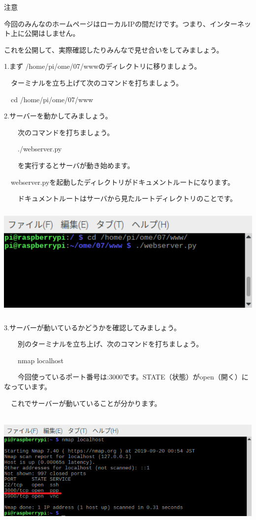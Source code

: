 \documentclass[a4paper,12pt,dvipdfmx]{jarticle}
\begin{document}
注意

今回のみんなのホームページはローカルIPの間だけです。つまり、インターネット上に公開はしません。

これを公開して、実際確認したりみんなで見せ合いをしてみましょう。


\bigskip

1.まず
/home/pi/ome/07/wwwのディレクトリに移りましょう。

\ \ ターミナルを立ち上げて次のコマンドを打ちましょう。

\ \ cd /home/pi/ome/07/www


\bigskip

2.サーバーを動かしてみましょう。

　\ \ 次のコマンドを打ちましょう。

\ \ 　./webserver.py

　\ \ を実行するとサーバが動き始めます。

\ \ webserver.pyを起動したディレクトリがドキュメントルートになります。

　\ \ ドキュメントルートはサーバから見たルートディレクトリのことです。



\centering
\includegraphics[width=14.986cm,height=5.565cm]{ome7-img038.png}
\flushleft


\bigskip


\bigskip

3.サーバーが動いているかどうかを確認してみましょう。

　\ \ 別のターミナルを立ち上げ、次のコマンドを打ちましょう。

\ \ 　nmap localhost

　\ \ 今回使っているポート番号は:3000です。STATE（状態）がopen（開く）になっています。

\ \ これでサーバーが動いていることが分かります。



\centering
\includegraphics[width=16.124cm,height=5.973cm]{ome7-img039.png}
\flushleft
\end{document}
